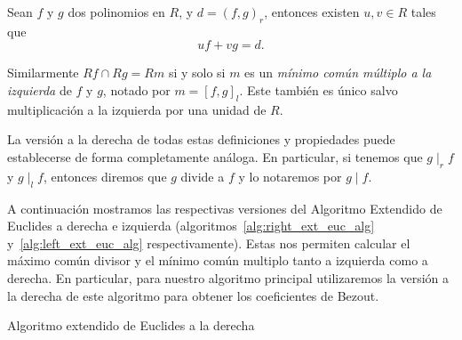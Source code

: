 \begin{proposition}
Sean \(f \text{ y } g\) dos polinomios en \(R\), y  \(d = {( f,g )_r}\), entonces existen \(u, v \in R\) tales que
\[
uf + vg = d
.\]
\end{proposition}

Similarmente  \(Rf \cap Rg = Rm\) si y solo si \(m\) es un \textit{mínimo común múltiplo a la izquierda} de \(f\) y \(g\), notado por \(m = {[f,g]}_l\). Este también es único salvo multiplicación a la izquierda por una unidad de \(R\).

La versión a la derecha de todas estas definiciones y propiedades puede establecerse de forma completamente análoga. En particular, si tenemos que \(g  \mid_r f\) y \(g  \mid_l f\), entonces diremos que \(g\) divide a \(f\) y lo notaremos por \(g  \mid f\).

A continuación mostramos las respectivas versiones del Algoritmo Extendido de Euclides a derecha e izquierda (algoritmos~\ref{alg:right_ext_euc_alg} y~\ref{alg:left_ext_euc_alg} respectivamente). Estas nos permiten calcular el máximo común divisor y el mínimo común multiplo tanto a izquierda como a derecha.
En particular, para nuestro algoritmo principal utilizaremos la versión a la derecha de este algoritmo para obtener los coeficientes de Bezout.

\begin{algorithm}[H]\label{alg:right_ext_euc_alg}
 \caption{Algoritmo extendido de Euclides a la derecha}
\end{algorithm}

